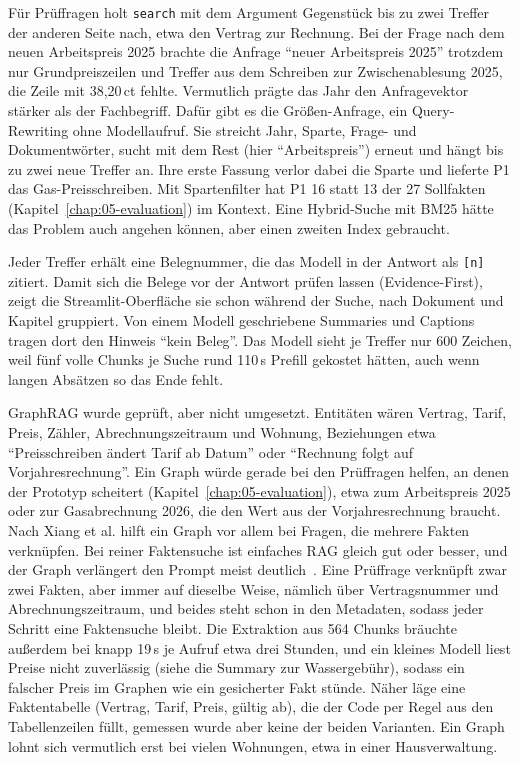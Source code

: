 Für Prüffragen holt \texttt{search} mit dem Argument Gegenstück bis zu zwei Treffer der anderen Seite nach, etwa den Vertrag zur Rechnung. Bei der Frage nach dem neuen Arbeitspreis 2025 brachte die Anfrage \enquote{neuer Arbeitspreis 2025} trotzdem nur Grundpreiszeilen und Treffer aus dem Schreiben zur Zwischenablesung 2025, die Zeile mit 38,20\,ct fehlte. Vermutlich prägte das Jahr den Anfragevektor stärker als der Fachbegriff. Dafür gibt es die Größen-Anfrage, ein Query-Rewriting ohne Modellaufruf. Sie streicht Jahr, Sparte, Frage- und Dokumentwörter, sucht mit dem Rest (hier \enquote{Arbeitspreis}) erneut und hängt bis zu zwei neue Treffer an. Ihre erste Fassung verlor dabei die Sparte und lieferte P1 das Gas-Preisschreiben. Mit Spartenfilter hat P1 16 statt 13 der 27 Sollfakten (Kapitel~\ref{chap:05-evaluation}) im Kontext. Eine Hybrid-Suche mit BM25 hätte das Problem auch angehen können, aber einen zweiten Index gebraucht.

Jeder Treffer erhält eine Belegnummer, die das Modell in der Antwort als \texttt{[n]} zitiert. Damit sich die Belege vor der Antwort prüfen lassen (Evidence-First), zeigt die Streamlit-Oberfläche sie schon während der Suche, nach Dokument und Kapitel gruppiert. Von einem Modell geschriebene Summaries und Captions tragen dort den Hinweis \enquote{kein Beleg}. Das Modell sieht je Treffer nur 600 Zeichen, weil fünf volle Chunks je Suche rund 110\,s Prefill gekostet hätten, auch wenn langen Absätzen so das Ende fehlt.

GraphRAG wurde geprüft, aber nicht umgesetzt. Entitäten wären Vertrag, Tarif, Preis, Zähler, Abrechnungszeitraum und Wohnung, Beziehungen etwa \enquote{Preisschreiben ändert Tarif ab Datum} oder \enquote{Rechnung folgt auf Vorjahresrechnung}. Ein Graph würde gerade bei den Prüffragen helfen, an denen der Prototyp scheitert (Kapitel~\ref{chap:05-evaluation}), etwa zum Arbeitspreis 2025 oder zur Gasabrechnung 2026, die den Wert aus der Vorjahresrechnung braucht. Nach Xiang et al. hilft ein Graph vor allem bei Fragen, die mehrere Fakten verknüpfen. Bei reiner Faktensuche ist einfaches RAG gleich gut oder besser, und der Graph verlängert den Prompt meist deutlich~\cite{xiang2026graphs}. Eine Prüffrage verknüpft zwar zwei Fakten, aber immer auf dieselbe Weise, nämlich über Vertragsnummer und Abrechnungszeitraum, und beides steht schon in den Metadaten, sodass jeder Schritt eine Faktensuche bleibt. Die Extraktion aus 564 Chunks bräuchte außerdem bei knapp 19\,s je Aufruf etwa drei Stunden, und ein kleines Modell liest Preise nicht zuverlässig (siehe die Summary zur Wassergebühr), sodass ein falscher Preis im Graphen wie ein gesicherter Fakt stünde. Näher läge eine Faktentabelle (Vertrag, Tarif, Preis, gültig ab), die der Code per Regel aus den Tabellenzeilen füllt, gemessen wurde aber keine der beiden Varianten. Ein Graph lohnt sich vermutlich erst bei vielen Wohnungen, etwa in einer Hausverwaltung.

